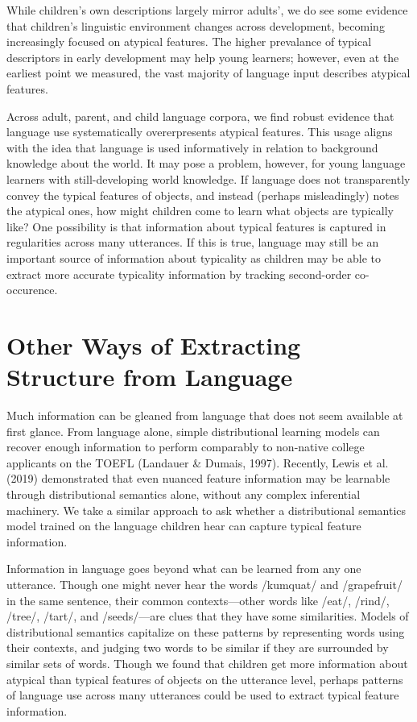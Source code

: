 \documentclass[10pt, letterpaper]{article}
\begin{document}
While children's own descriptions largely mirror adults', we do see some
evidence that children's linguistic environment changes across
development, becoming increasingly focused on atypical features. The
higher prevalance of typical descriptors in early development may help
young learners; however, even at the earliest point we measured, the
vast majority of language input describes atypical features.

Across adult, parent, and child language corpora, we find robust
evidence that language use systematically overerpresents atypical
features. This usage aligns with the idea that language is used
informatively in relation to background knowledge about the world. It
may pose a problem, however, for young language learners with
still-developing world knowledge. If language does not transparently
convey the typical features of objects, and instead (perhaps
misleadingly) notes the atypical ones, how might children come to learn
what objects are typically like? One possibility is that information
about typical features is captured in regularities across many
utterances. If this is true, language may still be an important source
of information about typicality as children may be able to extract more
accurate typicality information by tracking second-order co-occurence.

\hypertarget{other-ways-of-extracting-structure-from-language}{%
\section{Other Ways of Extracting Structure from
Language}\label{other-ways-of-extracting-structure-from-language}}

Much information can be gleaned from language that does not seem
available at first glance. From language alone, simple distributional
learning models can recover enough information to perform comparably to
non-native college applicants on the TOEFL (Landauer \& Dumais, 1997).
Recently, Lewis et al. (2019) demonstrated that even nuanced feature
information may be learnable through distributional semantics alone,
without any complex inferential machinery. We take a similar approach to
ask whether a distributional semantics model trained on the language
children hear can capture typical feature information.

Information in language goes beyond what can be learned from any one
utterance. Though one might never hear the words /kumquat/ and
/grapefruit/ in the same sentence, their common contexts---other words
like /eat/, /rind/, /tree/, /tart/, and /seeds/---are clues that they
have some similarities. Models of distributional semantics capitalize on
these patterns by representing words using their contexts, and judging
two words to be similar if they are surrounded by similar sets of words.
Though we found that children get more information about atypical than
typical features of objects on the utterance level, perhaps patterns of
language use across many utterances could be used to extract typical
feature information.
\end{document}
